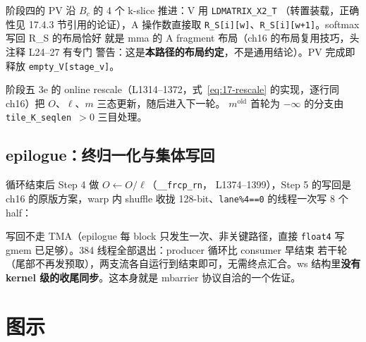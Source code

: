 

阶段四的 PV 沿 $B_c$ 的 4 个 k-slice 推进：V 用 \texttt{LDMATRIX\_\allowbreak{}X2\_\allowbreak{}T}
（转置装载，正确性见 17.4.3 节引用的论证），A 操作数直接取
\texttt{R\_S[i][w]}、\texttt{R\_S[i][w+1]}。softmax 写回 R\_S 的布局恰好
就是 mma 的 A fragment 布局（ch16 的布局复用技巧，头注释 L24--27 有专门
警告：这是\textbf{本路径的布局约定}，不是通用结论）。PV 完成即释放
\texttt{empty\_\allowbreak{}V[stage\_\allowbreak{}v]}。

阶段五 3e 的 online rescale（L1314--1372，式~\ref{eq:17-rescale}
的实现，逐行同 ch16）把 $O$、$\ell$、$m$ 三态更新，随后进入下一轮。
$m^{\text{old}}$ 首轮为 $-\infty$ 的分支由 \texttt{tile\_\allowbreak{}K\_\allowbreak{}seqlen $> 0$}
三目处理。

\subsection{epilogue：终归一化与集体写回}

循环结束后 Step 4 做 $O \leftarrow O / \ell$（\texttt{\_\_frcp\_rn}，
L1374--1399），Step 5 的写回是 ch16 的原版方案，warp 内 shuffle 收拢
128-bit、\texttt{lane\%4==0} 的线程一次写 8 个 half：



写回不走 TMA（epilogue 每 block 只发生一次、非关键路径，直接 \texttt{float4}
写 gmem 已足够）。384 线程全部退出：producer 循环比 consumer 早结束
若干轮（尾部不再发预取），两支流各自运行到结束即可，无需终点汇合。ws
结构里\textbf{没有 kernel 级的收尾同步}。这本身就是 mbarrier 协议自洽的一个佐证。

\needspace{120mm}

\section{图示}

